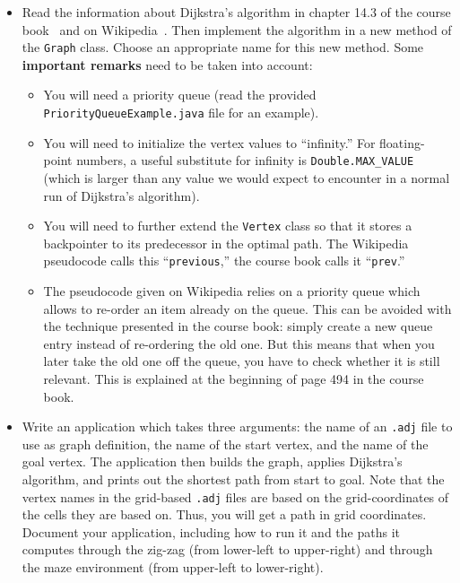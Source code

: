 \documentclass[a4paper,10pt]{article}
\begin{document}
\begin{itemize}
\item
  Read the information about Dijkstra's algorithm in chapter 14.3 of the course book~\cite{weiss:2005} and on Wikipedia~\cite{wikipedia:dijkstra}.
  Then implement the algorithm in a new method of the \texttt{Graph} class.
  Choose an appropriate name for this new method.
  Some \textbf{important remarks} need to be taken into account:
  \begin{itemize}
  \item
    You will need a priority queue (read the provided \texttt{PriorityQueueExample.java} file for an example).
  \item
    You will need to initialize the vertex values to ``infinity.''
    For floating-point numbers, a useful substitute for infinity is \texttt{Double.MAX\_VALUE} (which is larger than any value we would expect to encounter in a normal run of Dijkstra's algorithm).
  \item
    You will need to further extend the \texttt{Vertex} class so that it stores a backpointer to its predecessor in the optimal path.
    The Wikipedia pseudocode calls this ``\texttt{previous},'' the course book calls it ``\texttt{prev}.''
  \item
    The pseudocode given on Wikipedia relies on a priority queue which allows to re-order an item already on the queue.
    This can be avoided with the technique presented in the course book:
    simply create a new queue entry instead of re-ordering the old one.
    But this means that when you later take the old one off the queue, you have to check whether it is still relevant.
    This is explained at the beginning of page 494 in the course book.
  \end{itemize}
  
\item
  Write an application which takes three arguments:
  the name of an \texttt{.adj} file to use as graph definition, the name of the start vertex, and the name of the goal vertex.
  The application then builds the graph, applies Dijkstra's algorithm, and prints out the shortest path from start to goal.
  Note that the vertex names in the grid-based \texttt{.adj} files are based on the grid-coordinates of the cells they are based on.
  Thus, you will get a path in grid coordinates.
  Document your application, including how to run it and the paths it computes through the zig-zag (from lower-left to upper-right) and through the maze environment (from upper-left to lower-right).
  
\end{itemize}
\end{document}
